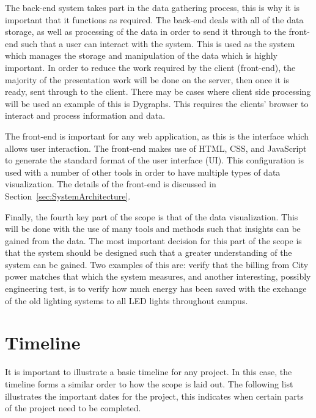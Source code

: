 \documentclass[12pt,onecolumn]{IEEEtran}
\begin{document}
The back-end system takes part in the data gathering process, this is why it is important that it functions as required. The back-end deals with all of the data storage, as well as processing of the data in order to send it through to the front-end such that a user can interact with the system. This is used as the system which manages the storage and manipulation of the data which is highly important. 
In order to reduce the work required by the client (front-end), the majority of the presentation work will be done on the server, then once it is ready, sent through to the client. 
There may be cases where client side processing will be used an example of this is Dygraphs. This requires the clients' browser to interact and process information and data\cite{dygraphs}.

The front-end is important for any web application, as this is the interface which allows user interaction.
The front-end makes use of HTML, CSS, and JavaScript to generate the standard format of the user interface (UI). This configuration is used with a number of other tools in order to have multiple types of data visualization.
The details of the front-end is discussed in Section~\ref{sec:SystemArchitecture}.

Finally, the fourth key part of the scope is that of the data visualization. This will be done with the use of many tools and methods such that insights can be gained from the data. The most important decision for this part of the scope is that the system should be designed such that a greater understanding of the system can be gained. Two examples of this are: verify that the billing from City power matches that which the system measures, and another interesting, possibly engineering test, is to verify how much energy has been saved with the exchange of the old lighting systems to all LED lights throughout campus. 




\section{Timeline} \label{sec:Timeline}
It is important to illustrate a basic timeline for any project. In this case, the timeline forms a similar order to how the scope is laid out. 
The following list illustrates the important dates for the project, this indicates when certain parts of the project need to be completed. 
\end{document}
